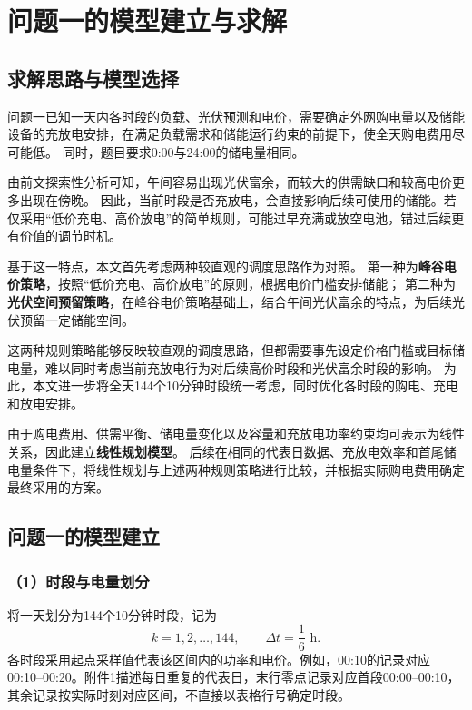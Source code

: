 \section{问题一的模型建立与求解}

\subsection{求解思路与模型选择}

问题一已知一天内各时段的负载、光伏预测和电价，需要确定外网购电量以及储能设备的充放电安排，在满足负载需求和储能运行约束的前提下，使全天购电费用尽可能低。
同时，题目要求0:00与24:00的储电量相同。

由前文探索性分析可知，午间容易出现光伏富余，而较大的供需缺口和较高电价更多出现在傍晚。
因此，当前时段是否充放电，会直接影响后续可使用的储能。若仅采用“低价充电、高价放电”的简单规则，可能过早充满或放空电池，错过后续更有价值的调节时机。

基于这一特点，本文首先考虑两种较直观的调度思路作为对照。
第一种为\textbf{峰谷电价策略}，按照“低价充电、高价放电”的原则，根据电价门槛安排储能；
第二种为\textbf{光伏空间预留策略}，在峰谷电价策略基础上，结合午间光伏富余的特点，为后续光伏预留一定储能空间。

这两种规则策略能够反映较直观的调度思路，但都需要事先设定价格门槛或目标储电量，难以同时考虑当前充放电行为对后续高价时段和光伏富余时段的影响。
为此，本文进一步将全天144个10分钟时段统一考虑，同时优化各时段的购电、充电和放电安排。

由于购电费用、供需平衡、储电量变化以及容量和充放电功率约束均可表示为线性关系，因此建立\textbf{线性规划模型}。
后续在相同的代表日数据、充放电效率和首尾储电量条件下，将线性规划与上述两种规则策略进行比较，并根据实际购电费用确定最终采用的方案。

\subsection{问题一的模型建立}

\subsubsection*{（1）时段与电量划分}

将一天划分为144个10分钟时段，记为
\[
k=1,2,\ldots,144,\qquad \Delta t=\frac{1}{6}\text{ h}.
\]
各时段采用起点采样值代表该区间内的功率和电价。例如，00:10的记录对应00:10--00:20。附件1描述每日重复的代表日，末行零点记录对应首段00:00--00:10，其余记录按实际时刻对应区间，不直接以表格行号确定时段。

